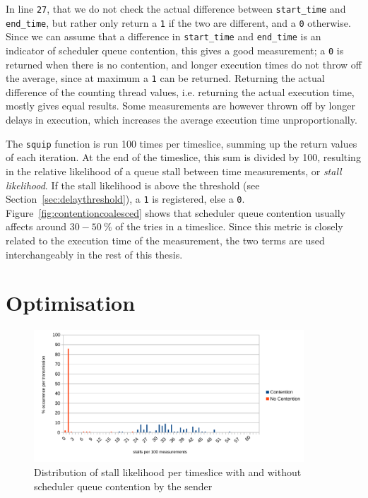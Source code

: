 \documentclass[11pt,
  titlepage=false,
  parskip=half,      %
]{scrreprt}
\begin{document}
In line \texttt{27}, that we do not check the actual difference between \texttt{start\_time} and \texttt{end\_time},
but rather only return a \texttt{1} if the two are different, and a \texttt{0} otherwise.
Since we can assume that a difference in \texttt{start\_time} and \texttt{end\_time} is an indicator of scheduler queue contention,
this gives a good measurement;
a \texttt{0} is returned when there is no contention, and longer execution times do not throw off the average,
since at maximum a \texttt{1} can be returned.
Returning the actual difference of the counting thread values, i.e. returning the actual execution time, mostly gives equal results.
Some measurements are however thrown off by longer delays in execution,
which increases the average execution time unproportionally.

The \texttt{squip} function is run 100 times per timeslice, summing up the return values of each iteration.
At the end of the timeslice, this sum is divided by 100,
resulting in the relative likelihood of a queue stall between time measurements, or \textit{stall likelihood}.
If the stall likelihood is above the threshold (see Section~\ref{sec:delaythreshold}), a \texttt{1} is registered, else a \texttt{0}.
Figure~\ref{fig:contentioncoalesced} shows that scheduler queue contention usually affects around $30-50~\%$ of the tries in a timeslice.
Since this metric is closely related to the execution time of the measurement, the two terms are used interchangeably in the rest of this thesis.


\chapter{Optimisation}
\label{ch:optimisation}
\begin{figure}
\centering
\includegraphics[width=0.9\textwidth]{figures/contentionhistogram}

\caption{Distribution of stall likelihood per timeslice with and without scheduler queue contention by the sender}
\label{fig:contentionhistogram}
\end{figure}
\end{document}
